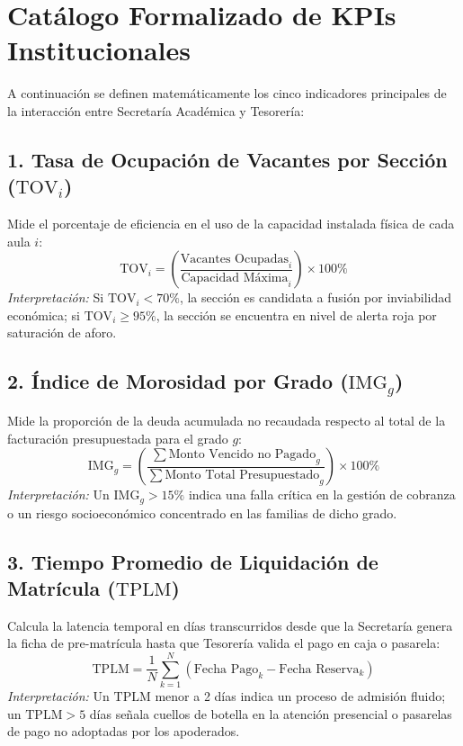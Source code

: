 \documentclass[12pt,a4paper,oneside]{report}
\begin{document}
\section{Catálogo Formalizado de KPIs Institucionales}

A continuación se definen matemáticamente los cinco indicadores principales de la interacción entre Secretaría Académica y Tesorería:

\subsection{1. Tasa de Ocupación de Vacantes por Sección ($\text{TOV}_i$)}
Mide el porcentaje de eficiencia en el uso de la capacidad instalada física de cada aula $i$:
\begin{equation}
\text{TOV}_i = \left( \frac{\text{Vacantes Ocupadas}_i}{\text{Capacidad Máxima}_i} \right) \times 100\%
\end{equation}
\textit{Interpretación:} Si $\text{TOV}_i < 70\%$, la sección es candidata a fusión por inviabilidad económica; si $\text{TOV}_i \ge 95\%$, la sección se encuentra en nivel de alerta roja por saturación de aforo.

\subsection{2. Índice de Morosidad por Grado ($\text{IMG}_g$)}
Mide la proporción de la deuda acumulada no recaudada respecto al total de la facturación presupuestada para el grado $g$:
\begin{equation}
\text{IMG}_g = \left( \frac{\sum \text{Monto Vencido no Pagado}_g}{\sum \text{Monto Total Presupuestado}_g} \right) \times 100\%
\end{equation}
\textit{Interpretación:} Un $\text{IMG}_g > 15\%$ indica una falla crítica en la gestión de cobranza o un riesgo socioeconómico concentrado en las familias de dicho grado.

\subsection{3. Tiempo Promedio de Liquidación de Matrícula ($\text{TPLM}$)}
Calcula la latencia temporal en días transcurridos desde que la Secretaría genera la ficha de pre-matrícula hasta que Tesorería valida el pago en caja o pasarela:
\begin{equation}
\text{TPLM} = \frac{1}{N} \sum_{k=1}^{N} \left( \text{Fecha Pago}_k - \text{Fecha Reserva}_k \right)
\end{equation}
\textit{Interpretación:} Un $\text{TPLM}$ menor a 2 días indica un proceso de admisión fluido; un $\text{TPLM} > 5$ días señala cuellos de botella en la atención presencial o pasarelas de pago no adoptadas por los apoderados.
\end{document}
